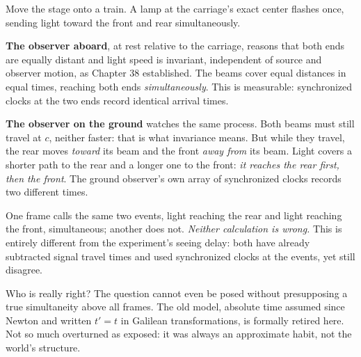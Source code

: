 \begin{mainline}
Move the stage onto a train. A lamp at the carriage's exact center flashes once, sending light toward the front and rear simultaneously.

\textbf{The observer aboard}, at rest relative to the carriage, reasons that both ends are equally distant and light speed is invariant, independent of source and observer motion, as Chapter 38 established. The beams cover equal distances in equal times, reaching both ends \emph{simultaneously}. This is measurable: synchronized clocks at the two ends record identical arrival times.

\textbf{The observer on the ground} watches the same process. Both beams must still travel at \(c\), neither faster: that is what invariance means. But while they travel, the rear moves \emph{toward} its beam and the front \emph{away from} its beam. Light covers a shorter path to the rear and a longer one to the front: \emph{it reaches the rear first, then the front}. The ground observer's own array of synchronized clocks records two different times.

\begin{center}
\end{center}

One frame calls the same two events, light reaching the rear and light reaching the front, simultaneous; another does not. \emph{Neither calculation is wrong.} This is entirely different from the experiment's seeing delay: both have already subtracted signal travel times and used synchronized clocks at the events, yet still disagree.

Who is really right? The question cannot even be posed without presupposing a true simultaneity above all frames. The old model, absolute time assumed since Newton and written \(t'=t\) in Galilean transformations, is formally retired here. Not so much overturned as exposed: it was always an approximate habit, not the world's structure.
\end{mainline}

